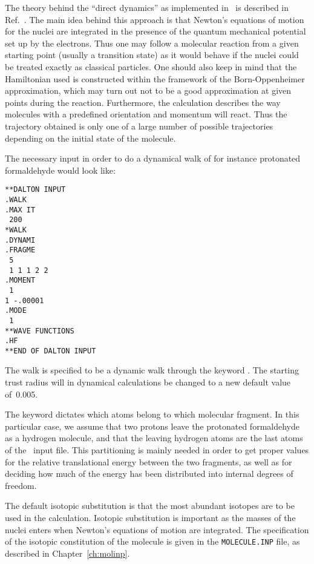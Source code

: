 The theory behind the ``direct dynamics'' as implemented in \dalton\ is
described in Ref.~\cite{theuhjajcpl173}. The
main idea behind this
approach is that Newton's equations of motion for the nuclei are
integrated in the presence of the quantum mechanical potential set up
by the electrons. Thus one may follow a molecular reaction from a
given starting point (usually a transition state) as it would behave
if the nuclei could be treated exactly as classical particles. One
should also keep in mind that the Hamiltonian used is constructed within
the framework of the Born-Oppenheimer approximation, which may turn
out not to be a good approximation at given points during the
reaction. Furthermore, the calculation describes the way molecules
with a predefined orientation and momentum will react. Thus
the trajectory obtained is only one of a large number of
possible trajectories depending on the initial state of the molecule.

The necessary input in order to do a dynamical walk of for instance
protonated formaldehyde would look like:

\begin{verbatim}
**DALTON INPUT
.WALK
.MAX IT
 200
*WALK
.DYNAMI
.FRAGME
 5
 1 1 1 2 2
.MOMENT
 1
1 -.00001
.MODE
 1
**WAVE FUNCTIONS
.HF
**END OF DALTON INPUT
\end{verbatim}

The walk is specified to
be a dynamic walk  through the keyword . The
starting trust radius will in dynamical calculations be changed to a
new default value of~0.005.

The keyword  dictates which atoms belong to which
molecular fragment. In this particular
case, we assume that two
protons leave the protonated formaldehyde as a
hydrogen molecule, and
that the leaving hydrogen atoms are the last atoms of the \mol\ input
file. This partitioning is mainly needed in order to get
proper values for the relative translational energy between the two
fragments, as well as for deciding how much of the energy has been
distributed into internal degrees of freedom.

The default isotopic substitution is that the most abundant
isotopes are to be used in the calculation. Isotopic
substitution is important as the masses of the nuclei enters when
Newton's equations of motion are integrated. The specification of the
isotopic constitution of the molecule is given in the
\verb|MOLECULE.INP| file, as described in Chapter~\ref{ch:molinp}.

